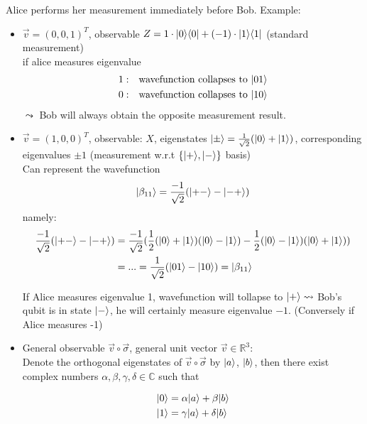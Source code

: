 Alice performs her measurement immediately before Bob.
Example:
\begin{itemize}
    \item $\vec{v} = (0, 0, 1)^T$, observable $Z = 1 \cdot \lvert0\rangle \langle0\rvert + (-1) \cdot \lvert1\rangle \langle1\rvert$
        (standard measurement) \\
        if alice measures eigenvalue
        \begin{align*}
            1: &\quad \text{wavefunction collapses to } \lvert01\rangle \\
            0: &\quad \text{wavefunction collapses to } \lvert10\rangle
        \end{align*}
        $\leadsto$ Bob will always obtain the opposite measurement result.
    
    \item $\vec{v} = (1, 0, 0)^T$, observable: $X$, eigenstates 
    $\lvert\pm\rangle = \frac{1}{\sqrt{2}}(\lvert0\rangle + \lvert1\rangle)$, corresponding eigenvalues
    $\pm 1$ (measurement w.r.t $\{\lvert+\rangle, \lvert-\rangle\}$ basis) \\
    Can represent the wavefunction
    \begin{equation}
        \lvert\beta_{11}\rangle = \frac{-1}{\sqrt{2}} (\lvert+-\rangle - \lvert-+\rangle)
    \end{equation}
    namely:
        \begin{align*}
            \frac{-1}{\sqrt{2}} (\lvert+-\rangle - \lvert-+\rangle) 
                &= \frac{-1}{\sqrt{2}} ( \frac{1}{2} (\lvert0\rangle + \lvert1\rangle)(\lvert0\rangle - \lvert1\rangle)
                - \frac{1}{2}(\lvert0\rangle - \lvert1\rangle)(\lvert0\rangle + \lvert1\rangle)) \\
                &= ... = \frac{1}{\sqrt{2}} (\lvert01\rangle - \lvert10\rangle) = \lvert\beta_{11}\rangle
        \end{align*}

    If Alice measures eigenvalue 1, wavefunction will tollapse to $\lvert+\rangle \leadsto$ 
    Bob's qubit is in state $\lvert-\rangle$, he will certainly measure eigenvalue $-1$.
    (Conversely if Alice measures -1)

    \item General observable $\vec{v} \circ \vec{\sigma}$, general unit vector 
    $\vec{v} \in \mathbb{R}^3$: \\
    Denote the orthogonal eigenstates of $\vec{v} \circ \vec{\sigma}$ by $\lvert a\rangle$, $\lvert b\rangle$,
    then there exist complex numbers $\alpha, \beta, \gamma, \delta \in \mathbb{C}$ such that

    \begin{align*}
        \lvert0\rangle &= \alpha \lvert a\rangle + \beta \lvert b\rangle \\
        \lvert1\rangle &= \gamma \lvert a\rangle + \delta \lvert b\rangle
    \end{align*}


\end{itemize}
